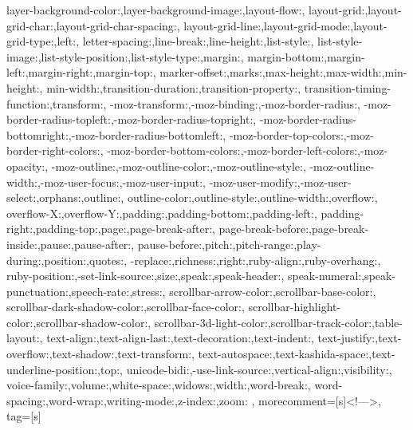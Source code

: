 {{		layer-background-color:,layer-background-image:,layout-flow:,
		layout-grid:,layout-grid-char:,layout-grid-char-spacing:,
		layout-grid-line:,layout-grid-mode:,layout-grid-type:,left:,
		letter-spacing:,line-break:,line-height:,list-style:,
		list-style-image:,list-style-position:,list-style-type:,margin:,
		margin-bottom:,margin-left:,margin-right:,margin-top:,
		marker-offset:,marks:,max-height:,max-width:,min-height:,
		min-width:,transition-duration:,transition-property:,
		transition-timing-function:,transform:,
		-moz-transform:,-moz-binding:,-moz-border-radius:,
		-moz-border-radius-topleft:,-moz-border-radius-topright:,
		-moz-border-radius-bottomright:,-moz-border-radius-bottomleft:,
		-moz-border-top-colors:,-moz-border-right-colors:,
		-moz-border-bottom-colors:,-moz-border-left-colors:,-moz-opacity:,
		-moz-outline:,-moz-outline-color:,-moz-outline-style:,
		-moz-outline-width:,-moz-user-focus:,-moz-user-input:,
		-moz-user-modify:,-moz-user-select:,orphans:,outline:,
		outline-color:,outline-style:,outline-width:,overflow:,
		overflow-X:,overflow-Y:,padding:,padding-bottom:,padding-left:,
		padding-right:,padding-top:,page:,page-break-after:,
		page-break-before:,page-break-inside:,pause:,pause-after:,
		pause-before:,pitch:,pitch-range:,play-during:,position:,quotes:,
		-replace:,richness:,right:,ruby-align:,ruby-overhang:,
		ruby-position:,-set-link-source:,size:,speak:,speak-header:,
		speak-numeral:,speak-punctuation:,speech-rate:,stress:,
		scrollbar-arrow-color:,scrollbar-base-color:,
		scrollbar-dark-shadow-color:,scrollbar-face-color:,
		scrollbar-highlight-color:,scrollbar-shadow-color:,
		scrollbar-3d-light-color:,scrollbar-track-color:,table-layout:,
		text-align:,text-align-last:,text-decoration:,text-indent:,
		text-justify:,text-overflow:,text-shadow:,text-transform:,
		text-autospace:,text-kashida-space:,text-underline-position:,top:,
		unicode-bidi:,-use-link-source:,vertical-align:,visibility:,
		voice-family:,volume:,white-space:,widows:,width:,word-break:,
		word-spacing:,word-wrap:,writing-mode:,z-index:,zoom:
	},  
	morecomment=[s]{<!--}{-->},
	tag=[s]
}

%


\makeatletter
\newcommand{\xRightarrow}[2][]{\ext@arrow 0359\Rightarrowfill@{#1}{#2}}
\makeatother